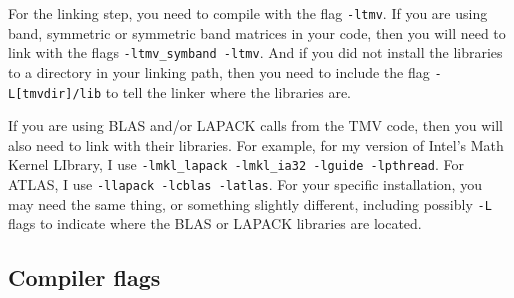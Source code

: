 \documentclass[twoside,letterpaper,11pt]{article}
\begin{document}
\begin{enumerate}
For the linking step, you need to compile with the flag
\texttt{-ltmv}.
If you are using band, symmetric or symmetric band matrices
in your code, then you will 
need to link with the flags \texttt{-ltmv\_symband -ltmv}.
And if you did not install the libraries to a directory in your linking path,
then you need to include the flag
\texttt{-L[tmvdir]/lib} to tell the linker where the libraries are.

If you are using BLAS and/or LAPACK calls from the TMV code,
then you will also need to 
link with their libraries.  
For example, for my version of Intel's Math Kernel LIbrary, I use 
\texttt{-lmkl\_lapack -lmkl\_ia32 -lguide -lpthread}.  
For ATLAS,
I use \texttt{-llapack -lcblas -latlas}.  For your specific installation, you may need 
the same thing, or something slightly different, including possibly
\texttt{-L} flags to indicate where the BLAS or LAPACK libraries are located.

\end{enumerate}

\subsection{Compiler flags}
\label{Install_Flags}
\end{document}
